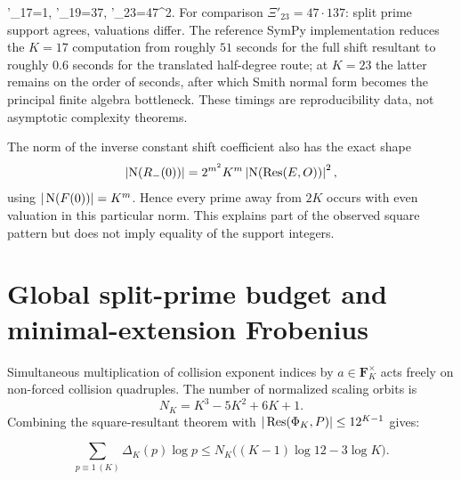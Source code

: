 \Theta'_{17}=1,\quad
\Theta'_{19}=37,\quad
\Theta'_{23}=47^2.
\]
For comparison $\Xi'_{23}=47\cdot137$: split prime support agrees, valuations
differ.  The reference SymPy implementation reduces the $K=17$ computation
from roughly $51$ seconds for the full shift resultant to roughly $0.6$ seconds
for the translated half-degree route; at $K=23$ the latter remains on the
order of seconds, after which Smith normal form becomes the principal finite
algebra bottleneck.  These timings are reproducibility data, not asymptotic
complexity theorems.

The norm of the inverse constant shift coefficient also has the exact shape
\begin{equation}\label{eq:inverse-norm}
\left|\operatorname{N}(R_-(0))\right|
 =2^{m^2}K^m\left|\operatorname{N}(\operatorname{Res}(E,O))\right|^2,
\end{equation}
using $|\operatorname{N}(F(0))|=K^m$.  Hence every prime away from $2K$ occurs with even
valuation in this particular norm.  This explains part of the observed square
pattern but does not imply equality of the support integers.

\section{Global split-prime budget and minimal-extension Frobenius}

Simultaneous multiplication of collision exponent indices by
$a\in\mathbf F_K^\times$ acts freely on non-forced collision quadruples.  The
number of normalized scaling orbits is
\[
N_K=K^3-5K^2+6K+1.
\]
Combining the square-resultant theorem with $|\operatorname{Res}(\Phi_K,P)|\le12^{K-1}$
gives:

\begin{theorem}\label{thm:budget}
\begin{equation}\label{eq:budget}
\sum_{p\equiv1\,(K)}\Delta_K(p)\log p
\le N_K\bigl((K-1)\log12-3\log K\bigr).
\end{equation}
\end{theorem}


